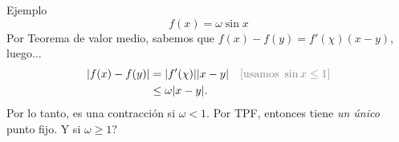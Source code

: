 \documentclass[12pt,aspectratio=169,xcolor=dvipsnames]{beamer}
\begin{document}
\begin{frame}{Ejemplo}
    $$f(x) = \omega \sin x $$
    Por Teorema de valor medio, sabemos que $f(x) - f(y)=f'(\chi)(x-y)$, luego... 
    \pause 
    \begin{equation*}
        \begin{aligned}
            |f(x) - f(y)| &= |f'(\chi)||x-y| && \textcolor{gray}{[\text{usamos } \sin x \leq 1]}\\
                        &\leq \omega |x-y|. 
        \end{aligned}
    \end{equation*}
    Por lo tanto, es una contracción si $\omega<1$. Por TPF, entonces tiene \emph{un único} punto fijo.  \pause \alert{Y si $\omega\geq1$? }

    \pause {}
\end{frame}
\begin{frame}
    \maketitle
\end{frame}
\end{document}
